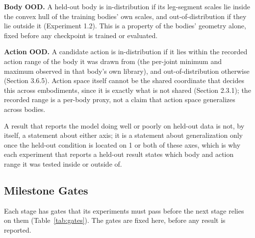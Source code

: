 \documentclass[12pt,a4paper,oneside]{report}
\begin{document}
\noindent\textbf{Body OOD.} A held-out body is in-distribution if its leg-segment scales lie inside the convex
hull of the training bodies' own scales, and out-of-distribution if they lie outside it (Experiment 1.2). This is
a property of the bodies' geometry alone, fixed before any checkpoint is trained or evaluated.

\noindent\textbf{Action OOD.} A candidate action is in-distribution if it lies within the recorded action range
of the body it was drawn from (the per-joint minimum and maximum observed in that body's own library), and
out-of-distribution otherwise (Section 3.6.5). Action space itself cannot be the shared coordinate that decides
this across embodiments, since it is exactly what is not shared (Section 2.3.1); the recorded range is a
per-body proxy, not a claim that action space generalizes across bodies.

A result that reports the model doing well or poorly on held-out data is not, by itself, a statement about
either axis; it is a statement about generalization only once the held-out condition is located on 1 or both of
these axes, which is why each experiment that reports a held-out result states which body and action range it
was tested inside or outside of.

\subsection{Milestone Gates}
Each stage has gates that its experiments must pass before the next stage relies on them (Table~\ref{tab:gates}). The gates are fixed here, before any result is reported.
\end{document}
